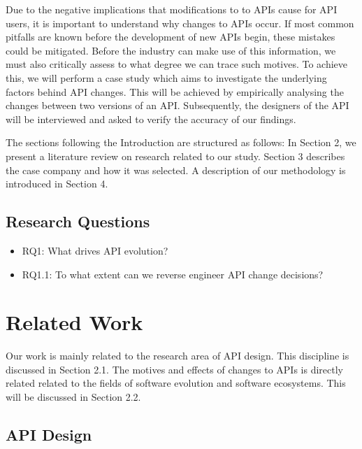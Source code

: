 \documentclass[10pt,twocolumn]{article}
\begin{document}
Due to the negative implications that modifications to to APIs cause for API users, it is important to understand why changes to APIs occur. If most common pitfalls are known before the development of new APIs begin, these mistakes could be mitigated. Before the industry can make use of this information, we must also critically assess to what degree we can trace such motives. To achieve this, we will perform a case study which aims to investigate the underlying factors behind API changes. This will be achieved by empirically analysing the changes between two versions of an API. Subsequently, the designers of the API will be interviewed and asked to verify the accuracy of our findings. 

The sections following the Introduction are structured as follows: In Section 2, we present a literature review on research related to our study. Section 3 describes the case company and how it was selected. A description of our methodology is introduced in Section 4. 

\subsection{Research Questions}
\begin{itemize}
\item RQ1: What drives API evolution? 
\item RQ1.1: To what extent can we reverse engineer API change decisions?
\end{itemize}


\section{Related Work}
Our work is mainly related to the research area of API design. This discipline is discussed in Section 2.1. The motives and effects of changes to APIs is directly related related to the fields of software evolution and software ecosystems. This will be discussed in Section 2.2. 

\subsection{API Design}
\end{document}
